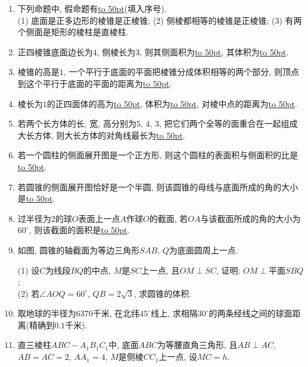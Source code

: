 \documentclass[10pt,a4paper]{article}
\newcommand{\blank}[1]{\underline{\hbox to #1pt{}}}
\begin{document}
\begin{enumerate}[1.]
\item 下列命题中, 假命题有\blank{50}(填入序号).\\
(1) 底面是正多边形的棱锥是正棱锥; (2) 侧棱都相等的棱锥是正棱锥; (3) 有两个侧面是矩形的棱柱是直棱柱.
\item 正四棱锥底面边长为$4$, 侧棱长为$3$, 则其侧面积为\blank{50}, 其体积为\blank{50}.
\item 棱锥的高是$1$, 一个平行于底面的平面把棱锥分成体积相等的两个部分, 则顶点到这个平行于底面的平面的距离为\blank{50}.
\item 棱长为$1$的正四面体的高为\blank{50}, 体积为\blank{50}, 对棱中点的距离为\blank{50}.
\item 若两个长方体的长, 宽, 高分别为$5$, $4$, $3$, 把它们两个全等的面重合在一起组成大长方体, 则大长方体的对角线最长为\blank{50}.
\item 若一个圆柱的侧面展开图是一个正方形, 则这个圆柱的表面积与侧面积的比是\blank{50}.
\item 若圆锥的侧面展开图恰好是一个半圆, 则该圆锥的母线与底面所成的角的大小是\blank{50}.
\item 过半径为$2$的球$O$表面上一点$A$作球$O$的截面, 若$OA$与该截面所成的角的大小为$60^\circ$, 则该截面的面积是\blank{50}.
\item 如图, 圆锥的轴截面为等边三角形$SAB$, $Q$为底面圆周上一点.
\begin{center}
\end{center}
(1) 设$C$为线段$BQ$的中点, $M$是$SC$上一点, 且$OM\perp SC$, 证明: $OM\perp\text{平面}SBQ$;\\
(2) 若$\angle AOQ=60^\circ$, $QB=2\sqrt 3$, 求圆锥的体积.
\item 取地球的半径为$6370$千米, 在北纬$45^\circ$线上, 求相隔$30^\circ$的两条经线之间的球面距离(精确到$0.1$千米).
\item 直三棱柱$ABC-A_1B_1C_1$中, 底面$ABC$为等腰直角三角形, 且$AB\perp AC$, $AB=AC=2$, $AA_1=4$, $M$是侧棱$CC_1$上一点, 设$MC=h$.\\

\end{enumerate}
\end{document}
